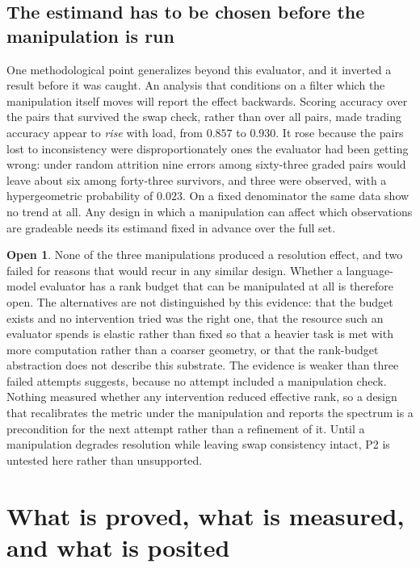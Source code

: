 \documentclass[11pt,letterpaper]{article}
\theoremstyle{plain}
\theoremstyle{definition}
\newtheorem{open}[theorem]{Open}
\begin{document}
\subsection*{The estimand has to be chosen before the manipulation is run}

One methodological point generalizes beyond this evaluator, and it inverted a
result before it was caught. An analysis that conditions on a filter which the
manipulation itself moves will report the effect backwards. Scoring accuracy over
the pairs that survived the swap check, rather than over all pairs, made trading
accuracy appear to \emph{rise} with load, from $0.857$ to $0.930$. It rose because
the pairs lost to inconsistency were disproportionately ones the evaluator had
been getting wrong: under random attrition nine errors among sixty-three graded
pairs would leave about six among forty-three survivors, and three were observed,
with a hypergeometric probability of $0.023$. On a fixed denominator the same
data show no trend at all. Any design in which a manipulation can affect which
observations are gradeable needs its estimand fixed in advance over the full set.

\begin{open}
\label{open:manipulable}
None of the three manipulations produced a resolution effect, and two failed for
reasons that would recur in any similar design. Whether a language-model
evaluator has a rank budget that can be manipulated at all is therefore open. The
alternatives are not distinguished by this evidence: that the budget exists and
no intervention tried was the right one, that the resource such an evaluator
spends is elastic rather than fixed so that a heavier task is met with more
computation rather than a coarser geometry, or that the rank-budget abstraction
does not describe this substrate. The evidence is weaker than three failed
attempts suggests, because no attempt included a manipulation check. Nothing
measured whether any intervention reduced effective rank, so a design that
recalibrates the metric under the manipulation and reports the spectrum is a
precondition for the next attempt rather than a refinement of it. Until a manipulation degrades resolution while
leaving swap consistency intact, P2 is untested here rather than unsupported.
\end{open}

\section{What is proved, what is measured, and what is posited}
\end{document}
